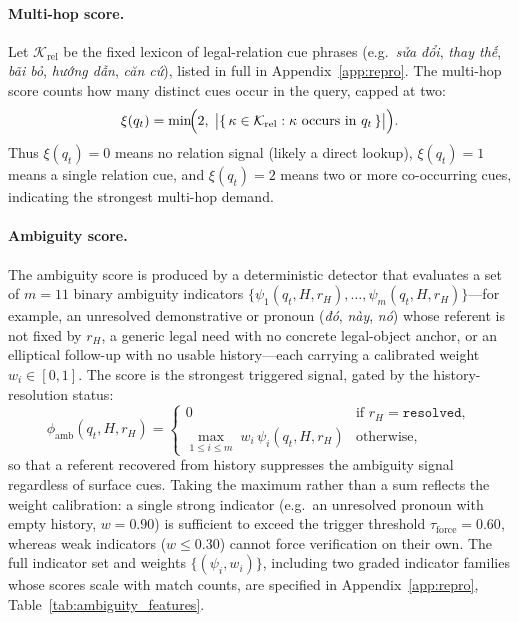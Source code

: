 \paragraph{Multi-hop score.}
Let $\mathcal{K}_{\mathrm{rel}}$ be the fixed lexicon of legal-relation cue
phrases (e.g.\ \textit{sửa đổi}, \textit{thay thế}, \textit{bãi bỏ},
\textit{hướng dẫn}, \textit{căn cứ}), listed in full in
Appendix~\ref{app:repro}. The multi-hop score counts how many distinct cues
occur in the query, capped at two:
\begin{equation}
\xi(q_t)=\min\!\Bigl(2,\;\bigl|\{\,\kappa\in\mathcal{K}_{\mathrm{rel}} : \kappa\ \text{occurs in}\ q_t\,\}\bigr|\Bigr).
\label{eq:multihop_score}
\end{equation}
Thus $\xi(q_t)=0$ means no relation signal (likely a direct lookup),
$\xi(q_t)=1$ means a single relation cue, and $\xi(q_t)=2$ means two or more
co-occurring cues, indicating the strongest multi-hop demand.

\paragraph{Ambiguity score.}
The ambiguity score is produced by a deterministic detector that evaluates a
set of $m=11$ binary ambiguity indicators
$\{\psi_1(q_t,H,r_H),\ldots,\psi_m(q_t,H,r_H)\}$---for example, an
unresolved demonstrative or pronoun (\textit{đó}, \textit{này}, \textit{nó})
whose referent is not fixed by $r_H$, a generic legal need with no concrete
legal-object anchor, or an elliptical follow-up with no usable history---each
carrying a calibrated weight $w_i\in[0,1]$. The score is the strongest
triggered signal, gated by the history-resolution status:
\begin{equation}
\phi_{\mathrm{amb}}(q_t,H,r_H)=
\begin{cases}
0 & \text{if } r_H=\texttt{resolved},\\[3pt]
\displaystyle\max_{1\le i\le m}\; w_i\,\psi_i(q_t,H,r_H) & \text{otherwise},
\end{cases}
\label{eq:ambiguity_score}
\end{equation}
so that a referent recovered from history suppresses the ambiguity signal
regardless of surface cues. Taking the maximum rather than a sum reflects the
weight calibration: a single strong indicator (e.g.\ an unresolved pronoun
with empty history, $w=0.90$) is sufficient to exceed the trigger threshold
$\tau_{\mathrm{force}}=0.60$, whereas weak indicators ($w\le 0.30$) cannot
force verification on their own. The full indicator set and weights
$\{(\psi_i,w_i)\}$, including two graded indicator families whose scores
scale with match counts, are specified in Appendix~\ref{app:repro},
Table~\ref{tab:ambiguity_features}.

